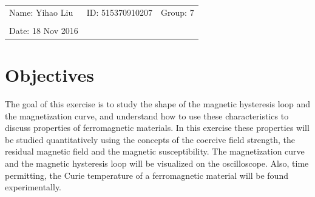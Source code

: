 \documentclass{article}
\begin{document}
\vspace*{0.25cm}

\hrulefill

\thispagestyle{empty}

\begin{center}
\begin{large}
\end{large}

\hrulefill

\vspace*{5cm}
\begin{Large}
\end{Large}

\vspace{2em}

\begin{large}
\end{large}
\end{center}


\vfill

\begin{table}[h!]
\flushleft
\begin{tabular}{lll}
Name: Yihao Liu \hspace*{2em}&
ID: 515370910207\hspace*{2em}& Group: 7\\


\\

Date: 18 Nov 2016 

\end{tabular}
\end{table}

\hfill
\begin{tiny}
[rev. 1.0]
\end{tiny}

\newpage

\tableofcontents

\newpage

\section{Objectives}

The goal of this exercise is to study the shape of the magnetic hysteresis loop and the
magnetization curve, and understand how to use these characteristics to discuss properties
of ferromagnetic materials. In this exercise these properties will be studied quantitatively
using the concepts of the coercive field strength, the residual magnetic field and the
magnetic susceptibility. The magnetization curve and the magnetic hysteresis loop will
be visualized on the oscilloscope. Also, time permitting, the Curie temperature of a
ferromagnetic material will be found experimentally.
\end{document}

